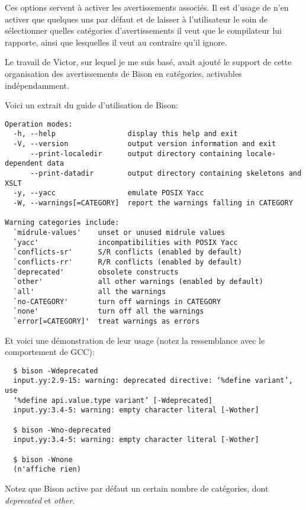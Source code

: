 \documentclass[a4paper,11pt,twoside,final]{article}
\begin{document}
  Ces options servent à activer les avertissements associés. Il est d'usage de
  n'en activer que quelques uns par défaut et de laisser à l'utilisateur le
  soin de sélectionner quelles catégories d'avertissements il veut que le
  compilateur lui rapporte, ainsi que lesquelles il veut au contraire qu'il
  ignore.

  Le travail de Victor, sur lequel je me suis basé, avait ajouté le support de
  cette organisation des avertissements de Bison en catégories, activables
  indépendamment.

  Voici un extrait du guide d'utilisation de Bison:

  \begin{verbatim}
Operation modes:
  -h, --help                 display this help and exit
  -V, --version              output version information and exit
      --print-localedir      output directory containing locale-dependent data
      --print-datadir        output directory containing skeletons and XSLT
  -y, --yacc                 emulate POSIX Yacc
  -W, --warnings[=CATEGORY]  report the warnings falling in CATEGORY

Warning categories include:
  `midrule-values'    unset or unused midrule values
  `yacc'              incompatibilities with POSIX Yacc
  `conflicts-sr'      S/R conflicts (enabled by default)
  `conflicts-rr'      R/R conflicts (enabled by default)
  `deprecated'        obsolete constructs
  `other'             all other warnings (enabled by default)
  `all'               all the warnings
  `no-CATEGORY'       turn off warnings in CATEGORY
  `none'              turn off all the warnings
  `error[=CATEGORY]'  treat warnings as errors
  \end{verbatim}

  Et voici une démonstration de leur usage (notez la ressemblance avec le
  comportement de GCC):

  \begin{verbatim}
  $ bison -Wdeprecated
  input.yy:2.9-15: warning: deprecated directive: ‘%define variant’, use
  ‘%define api.value.type variant’ [-Wdeprecated]
  input.yy:3.4-5: warning: empty character literal [-Wother]

  $ bison -Wno-deprecated
  input.yy:3.4-5: warning: empty character literal [-Wother]

  $ bison -Wnone
  (n'affiche rien)
  \end{verbatim}

  Notez que Bison active par défaut un certain nombre de catégories, dont
  \textit{deprecated} et \textit{other}.
\end{document}
